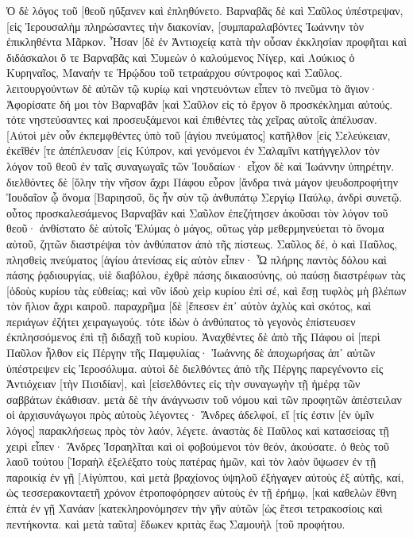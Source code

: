 Ὁ δὲ λόγος τοῦ [θεοῦ ηὔξανεν καὶ ἐπληθύνετο. 
Βαρναβᾶς δὲ καὶ Σαῦλος ὑπέστρεψαν, [εἰς Ἰερουσαλὴμ πληρώσαντες τὴν διακονίαν, [συμπαραλαβόντες Ἰωάννην τὸν ἐπικληθέντα Μᾶρκον. 
Ἦσαν [δὲ ἐν Ἀντιοχείᾳ κατὰ τὴν οὖσαν ἐκκλησίαν προφῆται καὶ διδάσκαλοι ὅ τε Βαρναβᾶς καὶ Συμεὼν ὁ καλούμενος Νίγερ, καὶ Λούκιος ὁ Κυρηναῖος, Μαναήν τε Ἡρῴδου τοῦ τετραάρχου σύντροφος καὶ Σαῦλος. 
λειτουργούντων δὲ αὐτῶν τῷ κυρίῳ καὶ νηστευόντων εἶπεν τὸ πνεῦμα τὸ ἅγιον· Ἀφορίσατε δή μοι τὸν Βαρναβᾶν [καὶ Σαῦλον εἰς τὸ ἔργον ὃ προσκέκλημαι αὐτούς. 
τότε νηστεύσαντες καὶ προσευξάμενοι καὶ ἐπιθέντες τὰς χεῖρας αὐτοῖς ἀπέλυσαν. 
[Αὐτοὶ μὲν οὖν ἐκπεμφθέντες ὑπὸ τοῦ [ἁγίου πνεύματος] κατῆλθον [εἰς Σελεύκειαν, ἐκεῖθέν [τε ἀπέπλευσαν [εἰς Κύπρον, 
καὶ γενόμενοι ἐν Σαλαμῖνι κατήγγελλον τὸν λόγον τοῦ θεοῦ ἐν ταῖς συναγωγαῖς τῶν Ἰουδαίων· εἶχον δὲ καὶ Ἰωάννην ὑπηρέτην. 
διελθόντες δὲ [ὅλην τὴν νῆσον ἄχρι Πάφου εὗρον [ἄνδρα τινὰ μάγον ψευδοπροφήτην Ἰουδαῖον ᾧ ὄνομα [Βαριησοῦ, 
ὃς ἦν σὺν τῷ ἀνθυπάτῳ Σεργίῳ Παύλῳ, ἀνδρὶ συνετῷ. οὗτος προσκαλεσάμενος Βαρναβᾶν καὶ Σαῦλον ἐπεζήτησεν ἀκοῦσαι τὸν λόγον τοῦ θεοῦ· 
ἀνθίστατο δὲ αὐτοῖς Ἐλύμας ὁ μάγος, οὕτως γὰρ μεθερμηνεύεται τὸ ὄνομα αὐτοῦ, ζητῶν διαστρέψαι τὸν ἀνθύπατον ἀπὸ τῆς πίστεως. 
Σαῦλος δέ, ὁ καὶ Παῦλος, πλησθεὶς πνεύματος [ἁγίου ἀτενίσας εἰς αὐτὸν 
εἶπεν· Ὦ πλήρης παντὸς δόλου καὶ πάσης ῥᾳδιουργίας, υἱὲ διαβόλου, ἐχθρὲ πάσης δικαιοσύνης, οὐ παύσῃ διαστρέφων τὰς [ὁδοὺς κυρίου τὰς εὐθείας; 
καὶ νῦν ἰδοὺ χεὶρ κυρίου ἐπὶ σέ, καὶ ἔσῃ τυφλὸς μὴ βλέπων τὸν ἥλιον ἄχρι καιροῦ. παραχρῆμα [δὲ [ἔπεσεν ἐπ᾽ αὐτὸν ἀχλὺς καὶ σκότος, καὶ περιάγων ἐζήτει χειραγωγούς. 
τότε ἰδὼν ὁ ἀνθύπατος τὸ γεγονὸς ἐπίστευσεν ἐκπλησσόμενος ἐπὶ τῇ διδαχῇ τοῦ κυρίου. 
Ἀναχθέντες δὲ ἀπὸ τῆς Πάφου οἱ [περὶ Παῦλον ἦλθον εἰς Πέργην τῆς Παμφυλίας· Ἰωάννης δὲ ἀποχωρήσας ἀπ᾽ αὐτῶν ὑπέστρεψεν εἰς Ἱεροσόλυμα. 
αὐτοὶ δὲ διελθόντες ἀπὸ τῆς Πέργης παρεγένοντο εἰς Ἀντιόχειαν [τὴν Πισιδίαν], καὶ [εἰσελθόντες εἰς τὴν συναγωγὴν τῇ ἡμέρᾳ τῶν σαββάτων ἐκάθισαν. 
μετὰ δὲ τὴν ἀνάγνωσιν τοῦ νόμου καὶ τῶν προφητῶν ἀπέστειλαν οἱ ἀρχισυνάγωγοι πρὸς αὐτοὺς λέγοντες· Ἄνδρες ἀδελφοί, εἴ [τίς ἐστιν [ἐν ὑμῖν λόγος] παρακλήσεως πρὸς τὸν λαόν, λέγετε. 
ἀναστὰς δὲ Παῦλος καὶ κατασείσας τῇ χειρὶ εἶπεν· Ἄνδρες Ἰσραηλῖται καὶ οἱ φοβούμενοι τὸν θεόν, ἀκούσατε. 
ὁ θεὸς τοῦ λαοῦ τούτου [Ἰσραὴλ ἐξελέξατο τοὺς πατέρας ἡμῶν, καὶ τὸν λαὸν ὕψωσεν ἐν τῇ παροικίᾳ ἐν γῇ [Αἰγύπτου, καὶ μετὰ βραχίονος ὑψηλοῦ ἐξήγαγεν αὐτοὺς ἐξ αὐτῆς, 
καί, ὡς τεσσερακονταετῆ χρόνον ἐτροποφόρησεν αὐτοὺς ἐν τῇ ἐρήμῳ, 
[καὶ καθελὼν ἔθνη ἑπτὰ ἐν γῇ Χανάαν [κατεκληρονόμησεν τὴν γῆν αὐτῶν 
[ὡς ἔτεσι τετρακοσίοις καὶ πεντήκοντα. καὶ μετὰ ταῦτα] ἔδωκεν κριτὰς ἕως Σαμουὴλ [τοῦ προφήτου. 
